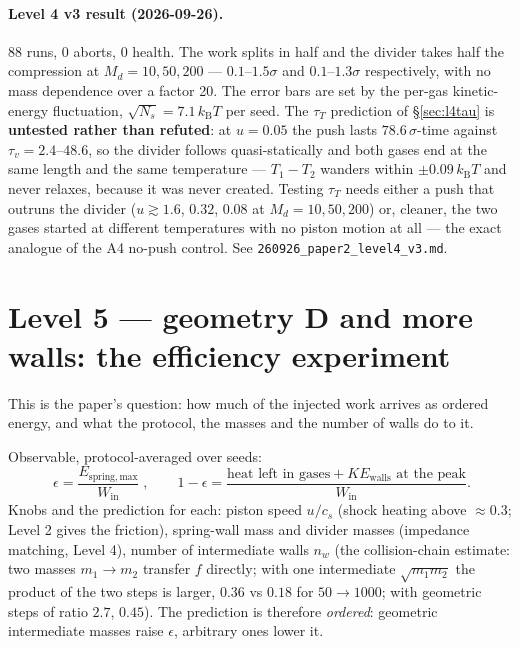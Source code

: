 \documentclass[11pt,a4paper]{article}
\newcommand{\kT}{k_{\mathrm B}T}
\begin{document}
\paragraph{Level 4 v3 result (2026-09-26).} 88 runs, 0 aborts, 0 health. The work splits in half
and the divider takes half the compression at $M_d = 10, 50, 200$ --- $0.1$--$1.5\sigma$ and
$0.1$--$1.3\sigma$ respectively, with no mass dependence over a factor 20. The error bars are set by
the per-gas kinetic-energy fluctuation, $\sqrt{N_s} = 7.1\,\kT$ per seed. The $\tau_T$ prediction of
\S\ref{sec:l4tau} is \textbf{untested rather than refuted}: at $u = 0.05$ the push lasts
$78.6\,\sigma$-time against $\tau_v = 2.4$--$48.6$, so the divider follows quasi-statically and both
gases end at the same length and the same temperature --- $T_1 - T_2$ wanders within
$\pm 0.09\,\kT$ and never relaxes, because it was never created. Testing $\tau_T$ needs either a
push that outruns the divider ($u \gtrsim 1.6$, $0.32$, $0.08$ at $M_d = 10, 50, 200$) or, cleaner,
the two gases started at different temperatures with no piston motion at all --- the exact analogue
of the A4 no-push control. See \texttt{260926\_paper2\_level4\_v3.md}.

\section{Level 5 --- geometry D and more walls: the efficiency experiment}

\begin{why}
This is the paper's question: how much of the injected work arrives as ordered energy, and what the protocol, the masses and the number of walls do to it.
\end{why}

Observable, protocol-averaged over seeds:
\begin{equation}
\boxed{\;\epsilon = \frac{E_{\mathrm{spring,max}}}{W_{\mathrm{in}}}\;},\qquad
1 - \epsilon = \frac{\text{heat left in gases} + KE_{\mathrm{walls}}\text{ at the peak}}{W_{\mathrm{in}}}.
\label{eq:eps}
\end{equation}
Knobs and the prediction for each: piston speed $u/c_s$ (shock heating above $\approx 0.3$; Level 2 gives the friction), spring-wall mass and divider masses (impedance matching, Level 4), number of intermediate walls $n_w$ (the collision-chain estimate: two masses $m_1 \to m_2$ transfer $f$ directly; with one intermediate $\sqrt{m_1m_2}$ the product of the two steps is larger, $0.36$ vs $0.18$ for $50 \to 1000$; with geometric steps of ratio $2.7$, $0.45$). The prediction is therefore \emph{ordered}: geometric intermediate masses raise $\epsilon$, arbitrary ones lower it.
\end{document}
